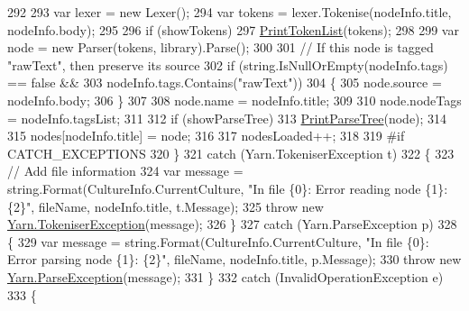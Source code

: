 \begin{DoxyCode}
292 
293                         var lexer = \textcolor{keyword}{new} Lexer();
294                         var tokens = lexer.Tokenise(nodeInfo.title, nodeInfo.body);
295 
296                         \textcolor{keywordflow}{if} (showTokens)
297                             \hyperlink{a00135_a9321fce224021841ce6f70ca7fbe531b}{PrintTokenList}(tokens);
298 
299                         var node = \textcolor{keyword}{new} Parser(tokens, library).Parse();
300 
301                         \textcolor{comment}{// If this node is tagged "rawText", then preserve its source}
302                         \textcolor{keywordflow}{if} (\textcolor{keywordtype}{string}.IsNullOrEmpty(nodeInfo.tags) == \textcolor{keyword}{false} &&
303                             nodeInfo.tags.Contains(\textcolor{stringliteral}{"rawText"}))
304                         \{
305                             node.source = nodeInfo.body;
306                         \}
307 
308                         node.name = nodeInfo.title;
309 
310                         node.nodeTags = nodeInfo.tagsList;
311 
312                         \textcolor{keywordflow}{if} (showParseTree)
313                             \hyperlink{a00135_aa105ea8e5d65a420d1089616523feecc}{PrintParseTree}(node);
314 
315                         nodes[nodeInfo.title] = node;
316 
317                         nodesLoaded++;
318 
319 \textcolor{preprocessor}{#if CATCH\_EXCEPTIONS}
320 \textcolor{preprocessor}{}                    \}
321                     \textcolor{keywordflow}{catch} (Yarn.TokeniserException t)
322                     \{
323                         \textcolor{comment}{// Add file information}
324                         var message = string.Format(CultureInfo.CurrentCulture, \textcolor{stringliteral}{"In file \{0\}: Error reading
       node \{1\}: \{2\}"}, fileName, nodeInfo.title, t.Message);
325                         \textcolor{keywordflow}{throw} \textcolor{keyword}{new} \hyperlink{a00176}{Yarn.TokeniserException}(message);
326                     \}
327                     \textcolor{keywordflow}{catch} (Yarn.ParseException p)
328                     \{
329                         var message = string.Format(CultureInfo.CurrentCulture, \textcolor{stringliteral}{"In file \{0\}: Error parsing
       node \{1\}: \{2\}"}, fileName, nodeInfo.title, p.Message);
330                         \textcolor{keywordflow}{throw} \textcolor{keyword}{new} \hyperlink{a00149}{Yarn.ParseException}(message);
331                     \}
332                     \textcolor{keywordflow}{catch} (InvalidOperationException e)
333                     \{

\end{DoxyCode}
